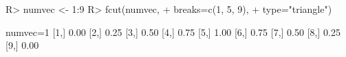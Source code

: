 \begin{Schunk}
% --begin: "fcut.numeric1"
\begin{Sinput}
R> numvec <- 1:9
R> fcut(numvec,
+       breaks=c(1, 5, 9),
+       type="triangle")
\end{Sinput}
\begin{Soutput}
      numvec=1
 [1,]     0.00
 [2,]     0.25
 [3,]     0.50
 [4,]     0.75
 [5,]     1.00
 [6,]     0.75
 [7,]     0.50
 [8,]     0.25
 [9,]     0.00
\end{Soutput}
%
% --end: "fcut.numeric1"
\end{Schunk}
